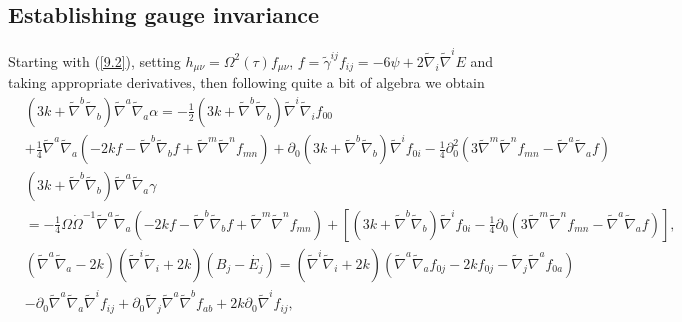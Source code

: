 \documentclass[aps,onecolumn,10pt]{revtex4}
\numberwithin{equation}{section}
\numberwithin{equation}{section}
\begin{document}
\subsection{Establishing gauge invariance}

Starting with (\ref{9.2}), setting $h_{\mu\nu}=\Omega^2(\tau)f_{\mu\nu}$,  $f=\tilde{\gamma}^{ij}f_{ij}=-6\psi+2\tilde{\nabla}_i\tilde{\nabla}^iE$ and taking appropriate derivatives, then following quite a bit of algebra we obtain
%
\begin{align}
&(3k+\tilde{\nabla}^b\tilde{\nabla}_b)\tilde{\nabla}^a\tilde{\nabla}_a\alpha=-\frac{1}{2}(3k+\tilde{\nabla}^b\tilde{\nabla}_b)\tilde{\nabla}^i\tilde{\nabla}_if_{00}
\nonumber\\
&+\frac{1}{4}\tilde{\nabla}^a\tilde{\nabla}_a\left(-2kf-\tilde{\nabla}^b\tilde{\nabla}_bf+\tilde{\nabla}^m\tilde{\nabla}^nf_{mn}\right)
+\partial_0(3k+\tilde{\nabla}^b\tilde{\nabla}_b)\tilde{\nabla}^if_{0i}-\frac{1}{4}\partial^2_0\left(3\tilde{\nabla}^m\tilde{\nabla}^nf_{mn}-\tilde{\nabla}^a\tilde{\nabla}_af\right)
\label{9.43a}
\end{align}
%
%
\begin{align}
&(3k+\tilde{\nabla}^b\tilde{\nabla}_b)\tilde{\nabla}^a\tilde{\nabla}_a\gamma
\nonumber\\
&=-\frac{1}{4}\Omega\dot{\Omega}^{-1}\tilde{\nabla}^a\tilde{\nabla}_a\left(-2kf-\tilde{\nabla}^b\tilde{\nabla}_bf+\tilde{\nabla}^m\tilde{\nabla}^nf_{mn}\right)
+\left[(3k+\tilde{\nabla}^b\tilde{\nabla}_b)\tilde{\nabla}^if_{0i}-\frac{1}{4}\partial_0\left(3\tilde{\nabla}^m\tilde{\nabla}^nf_{mn}-\tilde{\nabla}^a\tilde{\nabla}_af\right)\right],
\label{9.44a}
\end{align}
%
%
\begin{align}
&(\tilde{\nabla}^a\tilde{\nabla}_a-2k)(\tilde{\nabla}^i\tilde{\nabla}_i +2k)(B_j-\dot{E_j})=(\tilde{\nabla}^i\tilde{\nabla}_i +2k)(\tilde{\nabla}^a\tilde{\nabla}_af_{0j}-2kf_{0j}
-\tilde{\nabla}_j\tilde{\nabla}^af_{0a})
\nonumber
\\
&-\partial_0\tilde{\nabla}^a\tilde{\nabla}_a\tilde{\nabla}^if_{ij}
+\partial_0\tilde{\nabla}_j\tilde{\nabla}^a\tilde{\nabla}^bf_{ab}
+2k\partial_0\tilde{\nabla}^if_{ij},
\label{9.45a}
\end{align}
%
\end{document}
